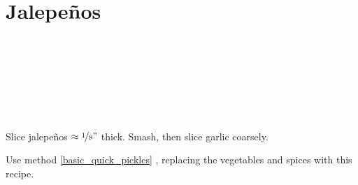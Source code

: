 \section{Jalepe\~{n}os}


\begin{ingredientcolumns}[1]
	\begin{ingredientblock}
		\\
		\\
		\\
		\\
		\\
		\\
	\end{ingredientblock}
\end{ingredientcolumns}


\begin{preparation}
\item Slice jalepe\~{n}os $\approx \nicefrac{1}{8} "$ thick.
	Smash, then slice garlic coarsely.

\item Use method \ref{basic_quick_pickles} , replacing the vegetables and spices with this recipe.
\end{preparation}


\recipeend
